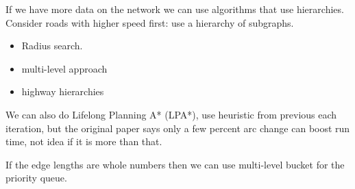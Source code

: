 If we have more data on the network we can use
algorithms that use hierarchies.
Consider roads with higher speed first: use a hierarchy of subgraphs.
\begin{itemize}
    \item Radius search.
    \item multi-level approach
    \item highway hierarchies
\end{itemize}


We can also do Lifelong Planning A* (LPA*), use heuristic from previous each iteration, but the original paper says only a few percent arc change can boost run time, not idea if it is more than that. 

If the edge lengths are whole numbers then we can use multi-level bucket for the priority queue.


